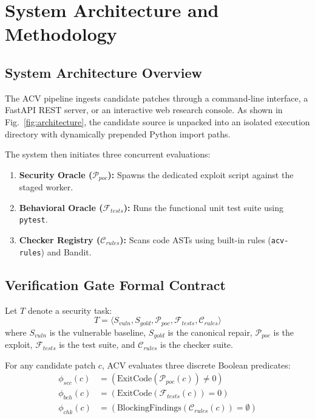 \documentclass[conference]{IEEEtran}
\begin{document}
\section{System Architecture and Methodology}

\subsection{System Architecture Overview}
The ACV pipeline ingests candidate patches through a command-line interface, a FastAPI REST server, or an interactive web research console. As shown in Fig.~\ref{fig:architecture}, the candidate source is unpacked into an isolated execution directory with dynamically prepended Python import paths.

The system then initiates three concurrent evaluations:
\begin{enumerate}
    \item \textbf{Security Oracle ($\mathcal{P}_{poc}$):} Spawns the dedicated exploit script against the staged worker.
    \item \textbf{Behavioral Oracle ($\mathcal{F}_{tests}$):} Runs the functional unit test suite using \texttt{pytest}.
    \item \textbf{Checker Registry ($\mathcal{C}_{rules}$):} Scans code ASTs using built-in rules (\texttt{acv-rules}) and Bandit.
\end{enumerate}

\subsection{Verification Gate Formal Contract}
Let $T$ denote a security task:
\begin{equation}
T = \langle S_{vuln}, S_{gold}, \mathcal{P}_{poc}, \mathcal{F}_{tests}, \mathcal{C}_{rules} \rangle
\end{equation}
where $S_{vuln}$ is the vulnerable baseline, $S_{gold}$ is the canonical repair, $\mathcal{P}_{poc}$ is the exploit, $\mathcal{F}_{tests}$ is the test suite, and $\mathcal{C}_{rules}$ is the checker suite.

For any candidate patch $c$, ACV evaluates three discrete Boolean predicates:
\begin{align}
\phi_{sec}(c) &= \left( \text{ExitCode}(\mathcal{P}_{poc}(c)) \ne 0 \right) \\
\phi_{beh}(c) &= \left( \text{ExitCode}(\mathcal{F}_{tests}(c)) = 0 \right) \\
\phi_{chk}(c) &= \left( \text{BlockingFindings}(\mathcal{C}_{rules}(c)) = \emptyset \right)
\end{align}
\end{document}
